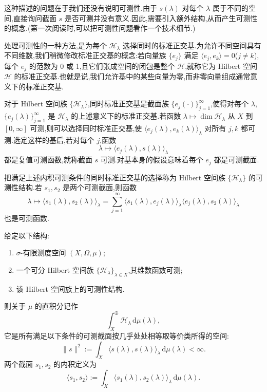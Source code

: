 {这种描述的问题在于我们还没有说明可测性.由于 \(s(\lambda)\) 对每个 \(\lambda\) 属于不同的空间,直接询问截面 \(s\) 是否可测并没有意义.因此,需要引入额外结构,从而产生可测性的概念.(第一次阅读时,可以把可测性问题看作一个技术细节.)

处理可测性的一种方法,是为每个 \(\mathcal{H}_{\lambda}\) 选择同时的标准正交基.为允许不同空间具有不同维数,我们稍微修改标准正交基的概念:若向量族 \(\{e_{j}\}\) 满足 \(\langle e_{j},e_{k}\rangle=0\)(\(j\neq k\)),每个 \(e_{j}\) 的范数为 0 或 1,且它们张成空间的闭包是整个 \(\mathcal{H}\),就称它为 Hilbert 空间 \(\mathcal{H}\) 的标准正交基.也就是说,我们允许基中的某些向量为零,而非零向量组成通常意义下的标准正交基.

对于 Hilbert 空间族 \(\{\mathcal{H}_{\lambda}\}\),同时标准正交基是截面族 \(\{e_{j}(\cdot)\}_{j=1}^{\infty}\),使得对每个 \(\lambda\),\(\{e_{j}(\lambda)\}_{j=1}^{\infty}\) 是 \(\mathcal{H}_{\lambda}\) 的上述意义下的标准正交基.若函数 \(\lambda\mapsto\dim\mathcal{H}_{\lambda}\) 从 \(X\) 到 \([0,\infty]\) 可测,则可以选择同时标准正交基,使 \(\langle e_{j}(\lambda),e_{k}(\lambda)\rangle_{\lambda}\) 对所有 \(j,k\) 都可测.选定这样的基后,若对每个 \(j\),函数
\[
\lambda\longmapsto\langle e_{j}(\lambda),s(\lambda)\rangle_{\lambda}
\]
都是复值可测函数,就称截面 \(s\) 可测.对基本身的假设意味着每个 \(e_{j}\) 都是可测截面.

把满足上述内积可测条件的同时标准正交基的选择称为 Hilbert 空间族 \(\{\mathcal{H}_{\lambda}\}\) 的可测性结构.若 \(s_{1},s_{2}\) 是两个可测截面,则函数
\[
\lambda\longmapsto\langle s_{1}(\lambda),s_{2}(\lambda)\rangle_{\lambda}
=\sum_{j=1}^{\infty}
\langle s_{1}(\lambda),e_{j}(\lambda)\rangle_{\lambda}
\langle e_{j}(\lambda),s_{2}(\lambda)\rangle_{\lambda}
\]
也是可测函数.

\begin{definition}\label{def:direct-integral}
给定以下结构:
\begin{enumerate}
\item \(\sigma\)-有限测度空间 \((X,\Omega,\mu)\);
\item 一个可分 Hilbert 空间族 \(\{\mathcal{H}_{\lambda}\}_{\lambda\in X}\),其维数函数可测;
\item 该 Hilbert 空间族上的可测性结构.
\end{enumerate}
则关于 \(\mu\) 的直积分记作
\[
\int_{X}^{\oplus}\mathcal{H}_{\lambda}\,\mathrm{d}\mu(\lambda),
\]
它是所有满足以下条件的可测截面按几乎处处相等取等价类所得的空间:
\[
\|s\|^{2}:=\int_{X}\langle s(\lambda),s(\lambda)\rangle_{\lambda}\,\mathrm{d}\mu(\lambda)<\infty.
\]
两个截面 \(s_{1},s_{2}\) 的内积定义为
\[
\langle s_{1},s_{2}\rangle
:=\int_{X}\langle s_{1}(\lambda),s_{2}(\lambda)\rangle_{\lambda}\,\mathrm{d}\mu(\lambda).
\]
\end{definition}

}
